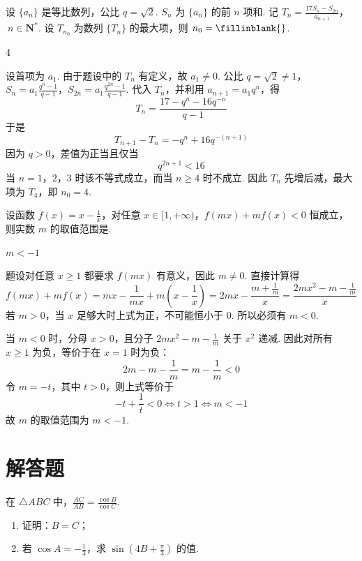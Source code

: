 \begin{problem}
设 \(\{a_n\}\) 是等比数列，公比 \(q = \sqrt{2}\). \(S_n\) 为 \(\{a_n\}\) 的前 \(n\) 项和. 记 \(T_n = \frac{17S_n - S_{2n}}{a_{n+1}}\)，\(\ n \in \mathbf{N}^{*}\). 设 \(T_{n_0}\) 为数列 \(\{T_n\}\) 的最大项，则 \(n_0 =\fillinblank{}\).
\end{problem}

\begin{answer}
4
\end{answer}

\begin{solution}
设首项为 \(a_1\). 由于题设中的 \(T_n\) 有定义，故 \(a_1\ne0\). 公比 \(q=\sqrt2\ne1\)，
\(S_n=a_1\frac{q^n-1}{q-1}\)，\(S_{2n}=a_1\frac{q^{2n}-1}{q-1}\).
代入 \(T_n\)，并利用 \(a_{n+1}=a_1q^n\)，得
\[
T_n=\frac{17-q^n-16q^{-n}}{q-1}
\]
于是
\[
T_{n+1}-T_n=-q^n+16q^{-(n+1)}
\]
因为 \(q>0\)，差值为正当且仅当
\[
q^{2n+1}<16
\]
当 \(n=1\)，\(2\)，\(3\) 时该不等式成立，而当 \(n\geqslant4\) 时不成立. 因此 \(T_n\) 先增后减，最大项为 \(T_4\)，即 \(n_0=4\).
\end{solution}

\begin{problem}
设函数 \(f(x) = x - \frac{1}{x}\)，对任意 \(x \in [1,+\infty)\)，\(f(mx) + mf(x) < 0\) 恒成立，则实数 \(m\) 的取值范围是\fillinblank{}.
\end{problem}

\begin{answer}
\(m < -1\)
\end{answer}

\begin{solution}
题设对任意 \(x\geqslant1\) 都要求 \(f(mx)\) 有意义，因此 \(m\ne0\). 直接计算得
\[
f(mx)+mf(x)=mx-\frac{1}{mx}+m\left(x-\frac1x\right)
=2mx-\frac{m+\frac{1}{m}}{x}
=\frac{2mx^2-m-\frac{1}{m}}{x}
\]
若 \(m>0\)，当 \(x\) 足够大时上式为正，不可能恒小于 0. 所以必须有 \(m<0\).

当 \(m<0\) 时，分母 \(x>0\)，且分子 \(2mx^2-m-\frac{1}{m}\) 关于 \(x^2\) 递减. 因此对所有 \(x\geqslant1\) 为负，等价于在 \(x=1\) 时为负：
\[
2m-m-\frac1m=m-\frac1m<0
\]
令 \(m=-t\)，其中 \(t>0\)，则上式等价于
\[
-t+\frac1t<0\iff t>1\iff m<-1
\]
故 \(m\) 的取值范围为 \(m<-1\).
\end{solution}

\section{解答题}

\begin{problem}
在 \(\triangle ABC\) 中，\(\frac{AC}{AB} = \frac{\cos B}{\cos C}\).

\begin{enumerate}
\item 证明：\(B = C\)；
\item 若 \(\cos A = -\frac{1}{3}\)，求 \(\sin \left(4B + \frac{\pi}{3}\right)\) 的值.
\end{enumerate}
\end{problem}

